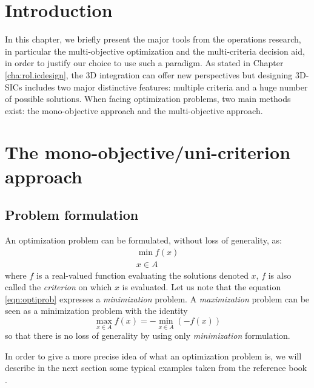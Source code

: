 \label{cha:rol2.mcda}

\begin{summary}
\lipsum[1]
\end{summary}


\section{Introduction}
\label{sec:rol2.intro}
In this chapter, we briefly present the major tools from the operations research, in particular the multi-objective optimization and the multi-criteria decision aid, in order to justify our choice to use such a paradigm. As stated in Chapter \ref{cha:rol.icdesign}, the 3D integration can offer new perspectives but designing 3D-SICs includes two major distinctive features: multiple criteria and a huge number of possible solutions. When facing optimization problems, two main methods exist: the mono-objective approach and the multi-objective approach.

\section{The mono-objective/uni-criterion approach}
\label{sec:rol2.monoobj_approach}

\subsection{Problem formulation}
An optimization problem can be formulated, without loss of generality, as:
\begin{equation}
\label{eqn:optiprob}
\begin{gathered}
\min f(x)\\
x \in A
\end{gathered}
\end{equation}
where $f$ is a real-valued function evaluating the solutions denoted $x$, $f$ is also called the \emph{criterion} on which $x$ is evaluated. Let us note that the equation \ref{eqn:optiprob} expresses a \emph{minimization} problem. A \emph{maximization} problem can be seen as a minimization problem with the identity
$$
\max_{x \in A} f(x) = - \min_{x \in A} (-f(x))
$$
so that there is no loss of generality by using only \emph{minimization} formulation.

In order to give a more precise idea of what an optimization problem is, we will describe in the next section some typical examples taken from the reference book \cite{talbi09}.

